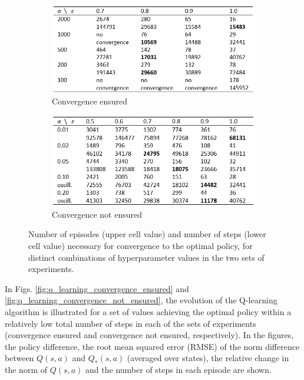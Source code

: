 \documentclass[a4paper]{article}
\begin{document}

\begin{figure}[htbp]
\begin{subfigure}{\textwidth}
\centering
\includegraphics[scale=0.8]{figures/table_results_convergence_ensured.png}
\caption{Convergence ensured}
\label{fig:table_results_convergence_ensured}
\end{subfigure}
\begin{subfigure}{\textwidth}
\centering
\includegraphics[scale=0.8]{figures/table_results_convergence_not_ensured.png}
\caption{Convergence not ensured}
\label{fig:table_results_convergence_not_ensured}
\end{subfigure}
\caption{Number of episodes (upper cell value) and number of steps (lower cell value) necessary for convergence to the optimal policy, for distinct combinations of hyperparameter values in the two sets of experiments.}
\label{fig:hyperparams_convergence}
\end{figure}

In Figs. \ref{fig:q_learning_convergence_ensured} and \ref{fig:q_learning_convergence_not_ensured}, the evolution of the Q-learning algorithm is illustrated for a set of values achieving the optimal policy within a relatively low total number of steps in each of the sets of experiments (convergence ensured and convergence not ensured, respectively). In the figures, the policy difference, the root mean squared error (RMSE) of the norm difference between $Q(s,a)$ and $Q_{*}(s,a)$ (averaged over states), the relative change in the norm of $Q(s,a)$ and the number of steps in each episode are shown.
\end{document}
